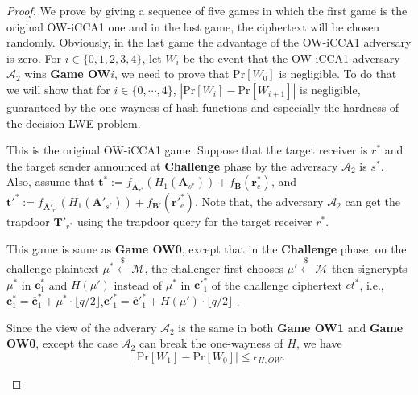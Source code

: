 \documentclass[a4paper,11pt,onecolumn]{elsarticle}
\def\Pr{\mathrm{Pr}}
\begin{document}
		\begin{proof} We prove by giving a sequence of five games in which the first game is the original OW-iCCA1 one and in the last game, the ciphertext will be chosen randomly. Obviously, in the last game  the advantage of the OW-iCCA1 adversary is zero.  For $i \in \{0,1,2,3,4\}$, let $W_i$ be the event that the OW-iCCA1 adversary $\mathcal{A}_2$ wins \textbf{Game OW$i$}, we need to prove that $\Pr[W_0] $ is negligible. To do that we will show that for $i\in \{0,\cdots, 4\}$, $|\Pr[W_{i}]-\Pr[W_{i+1}]| $ is negligible, guaranteed by the one-wayness of hash functions  and especially the hardness of the decision LWE problem.
			
			\begin{description}
				\item[Game OW0.] This is the original OW-iCCA1 game. Suppose that the target receiver is $r^*$ and the target sender announced at \textbf{Challenge} phase by the adversary $\mathcal{A}_2$ is $s^*$. Also, assume that $\textbf{t}^*:=f_{\overline{\textbf{A}}_{r^*}}(H_1(\textbf{A}_{s^*}))+f_{\textbf{B}}(\textbf{r}^*_e)$, and $\textbf{t}'^*:=f_{\overline{\textbf{A}}'_{r^*}}(H_1(\textbf{A}'_{s^*}))+f_{\textbf{B}'}(\textbf{r}'^*_e)$. Note that, the adversary $\mathcal{A}_2$ can get the trapdoor $\textbf{T}'_{r^*}$ using the trapdoor query for the target receiver $r^*$.
		
			\item[Game OW1.]  This game is same as \textbf{Game OW0}, except that  in the \textbf{Challenge} phase, on the challenge plaintext $\mu^*  \xleftarrow{\$}\mathcal{M}$, the challenger first chooses $\mu' \xleftarrow{\$}\mathcal{M}$ then signcrypts $\mu^*$  in $\textbf{c}_1^*$  and  $ H(\mu')$ instead of $\mu^*$ in ${\textbf{c}'}_1^*$ of the challenge ciphertext $ct^*$, i.e.,  $\textbf{c}^*_1=\overline{\textbf{c}}^*_1+ \mu^* \cdot \lfloor q/2\rfloor$,\quad  $\textbf{c}'^*_1=\overline{\textbf{c}}'^*_1+ H(\mu') \cdot \lfloor q/2\rfloor$	.
			
			\item 			 Since the view of the adverary $\mathcal{A}_2$ is the same  in both \textbf{Game OW1} and \textbf{Game OW0},  except the case $\mathcal{A}_2$ can break the one-wayness of $H$, we have $$|\Pr[W_1]-\Pr[W_0]|\leq \epsilon_{H,OW}.$$ 
								 	

\end{description}
\end{proof}
\end{document}
